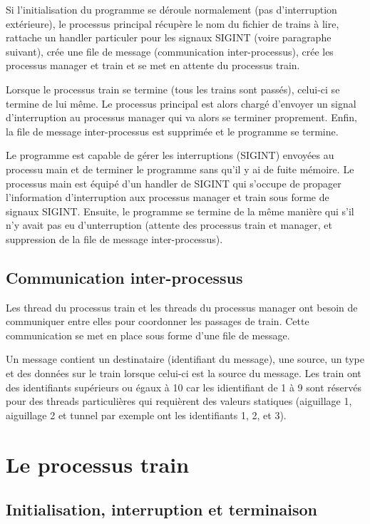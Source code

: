 \documentclass[a4paper,12pt]{article}
\begin{document}
Si l'initialisation du programme se déroule normalement (pas d'interruption extérieure), le processus principal récupère le nom du fichier de trains à lire, rattache un handler particuler pour les signaux SIGINT (voire paragraphe suivant), crée une file de message (communication inter-processus), crée les processus manager et train et se met en attente du processus train.

Lorsque le processus train se termine (tous les trains sont passés), celui-ci se termine de lui même. Le processus principal est alors chargé d'envoyer un signal d'interruption au processus manager qui va alors se terminer proprement. Enfin, la file de message inter-processus est supprimée et le programme se termine.

Le programme est capable de gérer les interruptions (SIGINT) envoyées au processu main et de terminer le programme sans qu'il y ai de fuite mémoire. Le processus main est équipé d'un handler de SIGINT qui s'occupe de propager l'information d'interruption aux processus manager et train sous forme de signaux SIGINT. Ensuite, le programme se termine de la même manière qui s'il n'y avait pas eu d'unterruption (attente des processus train et manager, et suppression de la file de message inter-processus).

\subsection{Communication inter-processus}

Les thread du processus train et les threads du processus manager ont besoin de communiquer entre elles pour coordonner les passages de train. Cette communication se met en place sous forme d'une file de message.

Un message contient un destinataire (identifiant du message), une source, un type et des données sur le train lorsque celui-ci est la source du message. Les train ont des identifiants supérieurs ou égaux à 10 car les idientifiant de 1 à 9 sont réservés pour des threads particulières qui requièrent des valeurs statiques (aiguillage 1, aiguillage 2 et tunnel par exemple ont les identifiants 1, 2, et 3).

\section{Le processus train}

\subsection{Initialisation, interruption et terminaison}
\end{document}
